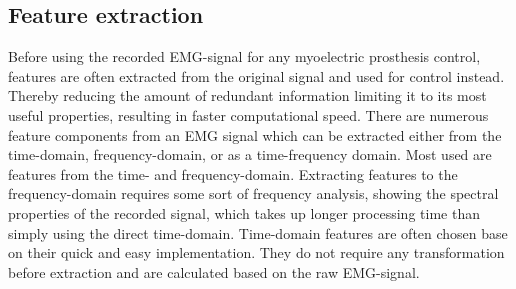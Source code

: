 
\subsection{Feature extraction}

Before using the recorded EMG-signal for any myoelectric prosthesis control, features are often extracted from the original signal and used for control instead. Thereby reducing the amount of redundant information limiting it to its most useful properties, resulting in faster computational speed. 
There are numerous feature components from an EMG signal which can be extracted either from the time-domain, frequency-domain, or as a time-frequency domain. Most used are features from the time- and frequency-domain. Extracting features to the frequency-domain requires some sort of frequency analysis, showing the spectral properties of the recorded signal, which takes up longer processing time than simply using the direct time-domain. 
Time-domain features are often chosen base on their quick and easy implementation. They do not require any transformation before extraction and are calculated based on the raw EMG-signal.\cite{Phiny2012} 